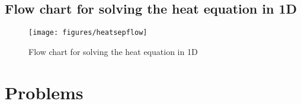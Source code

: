 \documentclass[12pt]{book}
\begin{document}
\newpage
\subsection{Flow chart for solving the heat equation in 1D}

\vspace{0.5in}
\begin{figure}[h]
  \centering
  \texttt{[image: figures/heatsepflow]}
  \caption{Flow chart for solving the heat equation in 1D}
  \label{fig:heatsepflow}
\end{figure}

\newpage
\section{Problems}
\end{document}
